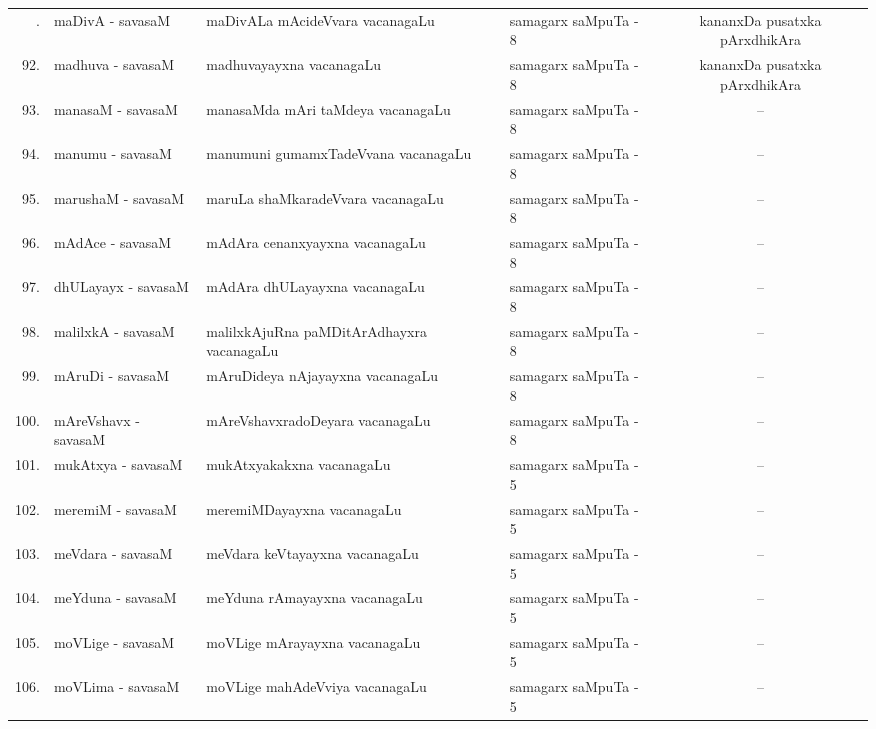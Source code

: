 {\renewcommand{\arraystretch}{1.3}
\begin{longtable}{rl>{\raggedright}p{5.5cm}lc}
\hline
\endfirsthead
\hline
\endhead
\hline
\endfoot
\endlastfoot
91. & maDivA - savasaM &  maDivALa mAcideVvara vacanagaLu & samagarx saMpuTa - 8 & kananxDa pusatxka pArxdhikAra\\
92. & madhuva - savasaM &  madhuvayayxna vacanagaLu & samagarx saMpuTa - 8 & kananxDa pusatxka pArxdhikAra\\
93. & manasaM - savasaM & manasaMda mAri taMdeya vacanagaLu & samagarx saMpuTa - 8 & --\\
94. & manumu - savasaM & manumuni gumamxTadeVvana vacanagaLu & samagarx saMpuTa - 8 & --\\
95. & marushaM - savasaM & maruLa shaMkaradeVvara vacanagaLu & samagarx saMpuTa - 8 & --\\
96. & mAdAce - savasaM & mAdAra cenanxyayxna vacanagaLu & samagarx saMpuTa - 8 & --\\
97. & dhULayayx - savasaM & mAdAra dhULayayxna vacanagaLu & samagarx saMpuTa - 8 & --\\
98. & malilxkA - savasaM & malilxkAjuRna paMDitArAdhayxra vacanagaLu & samagarx saMpuTa - 8 & --\\
99. & mAruDi - savasaM & mAruDideya nAjayayxna vacanagaLu & samagarx saMpuTa - 8 & --\\
100. & mAreVshavx - savasaM & mAreVshavxradoDeyara vacanagaLu & samagarx saMpuTa - 8 & --\\
101. & mukAtxya - savasaM & mukAtxyakakxna vacanagaLu & samagarx saMpuTa - 5 & --\\
102. & meremiM - savasaM & meremiMDayayxna vacanagaLu & samagarx saMpuTa - 5 & --\\
103. & meVdara - savasaM & meVdara keVtayayxna vacanagaLu & samagarx saMpuTa - 5 & --\\
104. & meYduna - savasaM & meYduna rAmayayxna vacanagaLu & samagarx saMpuTa - 5 & --\\
105. & moVLige - savasaM & moVLige mArayayxna vacanagaLu & samagarx saMpuTa - 5 & --\\
106. & moVLima - savasaM & moVLige mahAdeVviya vacanagaLu & samagarx saMpuTa - 5 & --\\
\hline
\end{longtable}}

